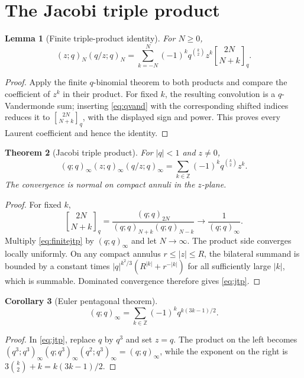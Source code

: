 \documentclass[11pt]{article}
\numberwithin{equation}{section}
\newtheorem{theorem}{Theorem}[section]
\newtheorem{lemma}[theorem]{Lemma}
\newtheorem{corollary}[theorem]{Corollary}
\theoremstyle{definition}
\newcommand{\Z}{\mathbb Z}
\begin{document}
\section{The Jacobi triple product}
\begin{lemma}[Finite triple-product identity]
For $N\ge0$,
\begin{equation}
(z;q)_N(q/z;q)_N
=\sum_{k=-N}^{N}(-1)^kq^{\binom k2}z^k
\genfrac{[}{]}{0pt}{}{2N}{N+k}_q.
\label{eq:finitejtp}
\end{equation}
\end{lemma}
\begin{proof}
Apply the finite $q$-binomial theorem to both products and compare the coefficient of $z^k$ in their product.  For fixed $k$, the resulting convolution is a $q$-Vandermonde sum; inserting \eqref{eq:qvand} with the corresponding shifted indices reduces it to $\genfrac{[}{]}{0pt}{}{2N}{N+k}_q$, with the displayed sign and power.  This proves every Laurent coefficient and hence the identity.
\end{proof}

\begin{theorem}[Jacobi triple product]
For $|q|<1$ and $z\ne0$,
\begin{equation}
(q;q)_\infty(z;q)_\infty(q/z;q)_\infty
=\sum_{k\in\Z}(-1)^kq^{\binom k2}z^k.
\label{eq:jtp}
\end{equation}
The convergence is normal on compact annuli in the $z$-plane.
\end{theorem}
\begin{proof}
For fixed $k$,
\[
\genfrac{[}{]}{0pt}{}{2N}{N+k}_q
=\frac{(q;q)_{2N}}{(q;q)_{N+k}(q;q)_{N-k}}
\longrightarrow\frac1{(q;q)_\infty}.
\]
Multiply \eqref{eq:finitejtp} by $(q;q)_\infty$ and let $N\to\infty$.  The product side converges locally uniformly.  On any compact annulus $r\le|z|\le R$, the bilateral summand is bounded by a constant times $|q|^{k^2/3}(R^{|k|}+r^{-|k|})$ for all sufficiently large $|k|$, which is summable.  Dominated convergence therefore gives \eqref{eq:jtp}.
\end{proof}

\begin{corollary}[Euler pentagonal theorem]
\[
(q;q)_\infty=\sum_{k\in\Z}(-1)^kq^{k(3k-1)/2}.
\]
\end{corollary}
\begin{proof}
In \eqref{eq:jtp}, replace $q$ by $q^3$ and set $z=q$.  The product on the left becomes
$(q^3;q^3)_\infty(q;q^3)_\infty(q^2;q^3)_\infty=(q;q)_\infty$, while the exponent on the right is $3\binom k2+k=k(3k-1)/2$.
\end{proof}
\end{document}
